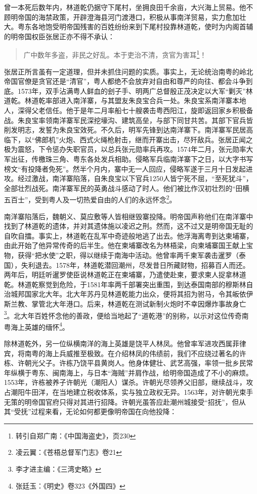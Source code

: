 曾一本死后数年内，林道乾仍据守下尾村，坐拥良田千余亩，大兴海上贸易。他不顾明帝国的海禁政策，开辟澄海县河门渡港口，积极从事南洋贸易，实力愈加壮大。粤东各地饱受明帝国残害的百姓纷纷来到下尾村投靠林道乾，使时为内阁首辅的明帝国权臣张居正亦不得不承认：

\begin{quote}
	广中数年多盗，非民之好乱。本于吏治不清，贪官为害耳\footnote{转引自郑广南：《中国海盗史》，页230}！
\end{quote}

张居正所言虽有一定道理，但并未抓住问题的实质。事实上，无论统治南粤的岭北帝国官僚是贪官还是“清官”，粤人都绝不会放弃对自由和尊严的向往、都会斗争到底。1573年，双手沾满粤人鲜血的刽子手、明两广总督殷正茂决定以大军“剿灭”林道乾。林道乾率部进入南洋寨，与其盟友朱良宝合兵一处。朱良宝系南洋寨本地人，深得父老信任。他于是年二月率船七十艘袭击粤西阳江，旋即返回家乡积极备战。朱良宝率领南洋寨军民深挖壕沟、建筑高垒，与部下同甘共苦。其部下官兵皆削发明志，发誓为朱良宝效死。不久后，明军先锋到达南洋寨下。南洋寨军民居高临下，以“佛郎机”火炮、西式火绳枪射击，继而开寨出击，尽歼敌兵。张居正闻之极为震怒，下令惩办失职官员，以总兵张元勋率兵再攻。1574年二月，张元勋率大军出征，传檄珠三角、粤东各处发兵相助。侵略军兵临南洋寨下之日，以大字书写榜文“有投降者免死”。然半个月内，寨中无一人回应，侵略军遂于三月十日发起进攻。经过激战，南洋寨陷落，自朱良宝以下官兵1250人皆宁死不屈，“至死犹斗”，全部壮烈战死。南洋寨军民的英勇战斗感动了时人。他们被比作汉初壮烈的“田横五百士”，受到粤人及一切热爱自由的人们的永远怀念\footnote{凌云翼：《苍梧总督军门志》卷21}。

南洋寨陷落后，魏朝义、莫应敷等人皆相继毁寨投降。明帝国声称他们在南洋寨中找到了林道乾的遗体，并对其遗体施以凌迟之刑。然而，这不过又是明帝国无耻的自吹自擂。事实上，林道乾在乱军中奇迹般地逃了出去。他浮海离粤到达柬埔寨，由此开始了他异常传奇的后半生。他在柬埔寨改名为林梧梁，向柬埔寨国王献上宝物，获得“把水使”之职，得以继续于南海中活动。他曾率两千柬军袭击暹罗（泰国），失利退去。1578年，林道乾潜回潮州，尽发昔日所藏财物，招募百人而还。两年后，明廷听暹罗使臣说林道乾正在柬埔寨，乃遣使赴柬，要求柬人捉拿林道乾。林道乾察觉到危险，于1581年率两千部署突出重围，到达泰国南部的穆斯林自治城邦国家北大年。北大年苏丹见林道乾能力出众，便将其招为驸马，令其皈依伊斯兰教、掌管北大年港口。后来，林道乾在测试新制火炮时不幸因爆炸事故身亡\footnote{李才进主编：《三湾史略》}。北大年百姓怀念他的善政，便给当地起了“道乾港”的别称，以示对这位传奇南粤海上英雄的缅怀\footnote{张廷玉：《明史》卷323《外国四》}。

除林道乾外，另一位纵横南洋的海上英雄是饶平人林凤。他曾率军进攻西属菲律宾，将南粤的海上兵威推至极致。在介绍林凤的伟绩前，我们不应绕过著名的许栋、许朝光父子。许栋乃饶平县黄岗人。他身体健壮、武艺高强，率领一批乡民常年纵横于粤东、闽南海上，与日本“海贼”并肩作战，给明帝国造成了不小的麻烦。1553年，许栋被养子许朝光（潮阳人）谋杀。许朝光尽领养父旧部，继续战斗，攻占潮阳牛田洋，在当地建立税收体系，实与独立政权无异。1563年，对许朝光束手无策的明帝国官府只得对其进行招降。许朝光虽答应赴潮州城接受“招抚”，但从其“受抚”过程来看，无论如何都更像明帝国在向他投降：

